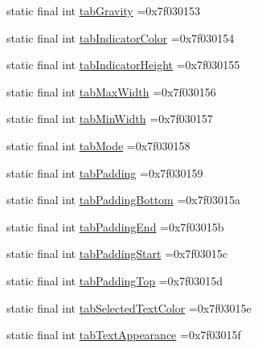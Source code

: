 \begin{DoxyCompactItemize}
\item 
static final int \mbox{\hyperlink{classbr_1_1unb_1_1cic_1_1mp_1_1marketmaster_1_1R_1_1attr_abf9389aa847135cebdbb6300a5f2697d}{tab\+Gravity}} =0x7f030153
\item 
static final int \mbox{\hyperlink{classbr_1_1unb_1_1cic_1_1mp_1_1marketmaster_1_1R_1_1attr_a97ab7cc98cfcaed4b589fcb7510ac126}{tab\+Indicator\+Color}} =0x7f030154
\item 
static final int \mbox{\hyperlink{classbr_1_1unb_1_1cic_1_1mp_1_1marketmaster_1_1R_1_1attr_a180bca4fe49c0e099f863d74609821aa}{tab\+Indicator\+Height}} =0x7f030155
\item 
static final int \mbox{\hyperlink{classbr_1_1unb_1_1cic_1_1mp_1_1marketmaster_1_1R_1_1attr_a4ae00e1a7cd6983ffa208533ffb17cd7}{tab\+Max\+Width}} =0x7f030156
\item 
static final int \mbox{\hyperlink{classbr_1_1unb_1_1cic_1_1mp_1_1marketmaster_1_1R_1_1attr_a06bd442b768e86f3c18b54b87e99c963}{tab\+Min\+Width}} =0x7f030157
\item 
static final int \mbox{\hyperlink{classbr_1_1unb_1_1cic_1_1mp_1_1marketmaster_1_1R_1_1attr_a05a800a0b6ca1e387e4b7ba8598ebf89}{tab\+Mode}} =0x7f030158
\item 
static final int \mbox{\hyperlink{classbr_1_1unb_1_1cic_1_1mp_1_1marketmaster_1_1R_1_1attr_acadb101c98ff5c0215183f1421dcd92b}{tab\+Padding}} =0x7f030159
\item 
static final int \mbox{\hyperlink{classbr_1_1unb_1_1cic_1_1mp_1_1marketmaster_1_1R_1_1attr_a55a1209f93e9b3ffa88070350aa4cb10}{tab\+Padding\+Bottom}} =0x7f03015a
\item 
static final int \mbox{\hyperlink{classbr_1_1unb_1_1cic_1_1mp_1_1marketmaster_1_1R_1_1attr_a838cd9d6b1c9ad727922ad8d594d6d11}{tab\+Padding\+End}} =0x7f03015b
\item 
static final int \mbox{\hyperlink{classbr_1_1unb_1_1cic_1_1mp_1_1marketmaster_1_1R_1_1attr_a7d00639c4a29e70ee0cb89bc42188bbc}{tab\+Padding\+Start}} =0x7f03015c
\item 
static final int \mbox{\hyperlink{classbr_1_1unb_1_1cic_1_1mp_1_1marketmaster_1_1R_1_1attr_ac45a4461225c4efb0c01d117133e9f3d}{tab\+Padding\+Top}} =0x7f03015d
\item 
static final int \mbox{\hyperlink{classbr_1_1unb_1_1cic_1_1mp_1_1marketmaster_1_1R_1_1attr_af3baa92e7c4aee228bdad839e61b708f}{tab\+Selected\+Text\+Color}} =0x7f03015e
\item 
static final int \mbox{\hyperlink{classbr_1_1unb_1_1cic_1_1mp_1_1marketmaster_1_1R_1_1attr_acdfd171b7a7eb92ebb0710a3dc2b051c}{tab\+Text\+Appearance}} =0x7f03015f

\end{DoxyCompactItemize}
